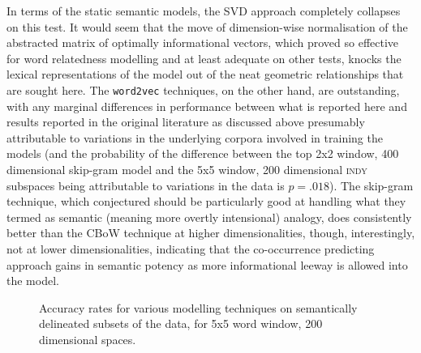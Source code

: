 In terms of the static semantic models, the SVD approach completely collapses on this test.  It would seem that the move of dimension-wise normalisation of the abstracted matrix of optimally informational vectors, which proved so effective for word relatedness modelling and at least adequate on other tests, knocks the lexical representations of the model out of the neat geometric relationships that are sought here.  The \texttt{word2vec} techniques, on the other hand, are outstanding, with any marginal differences in performance between what is reported here and results reported in the original literature as discussed above presumably attributable to variations in the underlying corpora involved in training the models (and the probability of the difference between the top 2x2 window, 400 dimensional skip-gram model and the 5x5 window, 200 dimensional \textsc{indy} subspaces being attributable to variations in the data is $p = .018$).  The skip-gram technique, which \cite{MikolovEA2013} conjectured should be particularly good at handling what they termed as semantic (meaning more overtly intensional) analogy, does consistently better than the CBoW technique at higher dimensionalities, though, interestingly, not at lower dimensionalities, indicating that the co-occurrence predicting approach gains in semantic potency as more informational leeway is allowed into the model.

\begin{figure}
\centering
\begin{subfigure}{1 \textwidth}
\end{subfigure}
\caption[Comparative Analogy Completion Scores] {Accuracy rates for various modelling techniques on semantically delineated subsets of the data, for 5x5 word window, 200 dimensional spaces.}
\label{fig:anaparisons}
\end{figure}

